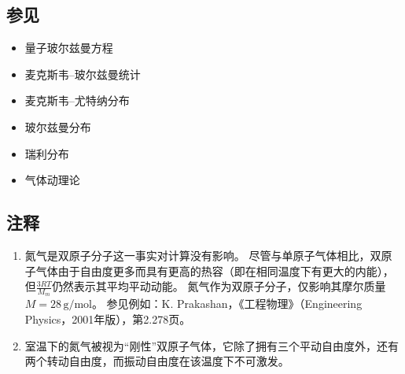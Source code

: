 \subsection{参见}
\begin{itemize}
\item 量子玻尔兹曼方程
\item 麦克斯韦–玻尔兹曼统计
\item 麦克斯韦–尤特纳分布
\item 玻尔兹曼分布
\item 瑞利分布
\item 气体动理论
\end{itemize}
\subsection{注释}
\begin{enumerate}
\item 氮气是双原子分子这一事实对计算没有影响。
   尽管与单原子气体相比，双原子气体由于自由度更多而具有更高的热容（即在相同温度下有更大的内能），但$\frac{3RT}{M_m}$仍然表示其平均平动动能。
   氮气作为双原子分子，仅影响其摩尔质量 $M = 28\, \mathrm{g/mol}$。
   参见例如：K. Prakashan，《工程物理》（Engineering Physics，2001年版），第2.278页。
\item 室温下的氮气被视为“刚性”双原子气体，它除了拥有三个平动自由度外，还有两个转动自由度，而振动自由度在该温度下不可激发。
\end{enumerate}
